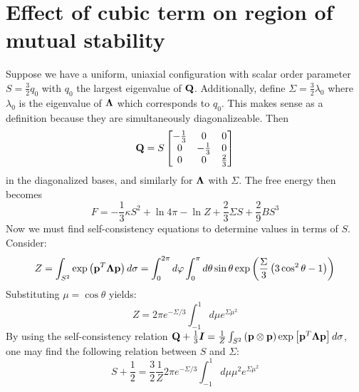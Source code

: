 \documentclass[reqno]{article}
\begin{document}
    \section{Effect of cubic term on region of mutual stability}

    Suppose we have a uniform, uniaxial configuration with scalar order parameter $S = \frac32 q_0$ with $q_0$ the largest eigenvalue of $\mathbf{Q}$.
    Additionally, define $\Sigma = \frac32 \lambda_0$ where $\lambda_0$ is the eigenvalue of $\boldsymbol{\Lambda}$ which corresponds to $q_0$.
    This makes sense as a definition because they are simultaneously diagonalizeable.
    Then
    \begin{equation}
        \mathbf{Q}
        =
        S
        \begin{bmatrix}
            -\frac13 &0 &0 \\
            0 &-\frac13 &0 \\
            0 &0 &\frac23
        \end{bmatrix}
    \end{equation}
    in the diagonalized bases, and similarly for $\boldsymbol{\Lambda}$ with $\Sigma$.
    The free energy then becomes
    \begin{equation}
        F
        =
        -\frac13 \kappa S^2
        + \ln 4\pi
        - \ln Z
        + \frac23 \Sigma S
        + \frac29 B S^3
    \end{equation}
    Now we must find self-consistency equations to determine values in terms of $S$.
    Consider:
    \begin{equation}
        Z
        =
        \int_{S^2}
        \exp \left(\mathbf p^T \boldsymbol{\Lambda} \mathbf p \right)
        d\sigma
        =
        \int_0^{2\pi} d \varphi
        \int_0^\pi d\theta \sin\theta
        \exp \left( \frac{\Sigma}{3} \left( 3 \cos^2\theta - 1 \right) \right)
    \end{equation}
    Substituting $\mu = \cos\theta$ yields:
    \begin{equation}
        Z
        =
        2 \pi e^{-\Sigma / 3}
        \int_{-1}^1 d\mu e^{\Sigma \mu^2}
    \end{equation}
    By using the self-consistency relation $\mathbf{Q} + \frac13 \boldsymbol I = \frac{1}{Z} \int_{S^2} \left( \mathbf p \otimes \mathbf p \right) \exp\left[ \mathbf p^T \boldsymbol{\Lambda} \mathbf p \right] d\sigma$, one may find the following relation between $S$ and $\Sigma$:
    \begin{equation}
        S + \frac12 
        =
        \frac32 \frac{1}{Z} 2\pi e^{-\Sigma / 3} \int_{-1}^1 d \mu \mu^2 e^{\Sigma \mu^2}
    \end{equation}
\end{document}
